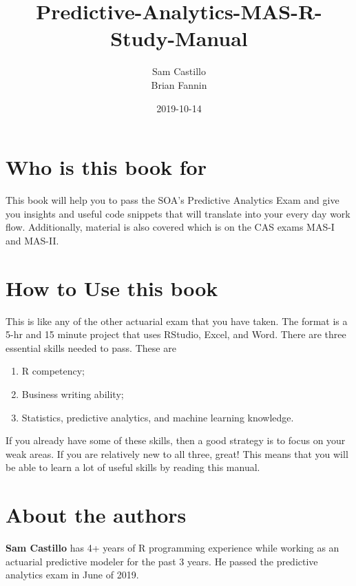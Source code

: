 \documentclass[]{book}
\title{Predictive-Analytics-MAS-R-Study-Manual}
\author{Sam Castillo \\ Brian Fannin}
\date{2019-10-14}
\providecommand{\tightlist}{%
  \setlength{\itemsep}{0pt}\setlength{\parskip}{0pt}}
\begin{document}
\maketitle

{
\setcounter{tocdepth}{1}
\tableofcontents
}
\hypertarget{who-is-this-book-for}{%
\chapter{Who is this book for}\label{who-is-this-book-for}}

This book will help you to pass the SOA's Predictive Analytics Exam and give you insights and useful code snippets that will translate into your every day work flow. Additionally, material is also covered which is on the CAS exams MAS-I and MAS-II.

\hypertarget{how-to-use-this-book}{%
\chapter{How to Use this book}\label{how-to-use-this-book}}

This is like any of the other actuarial exam that you have taken. The format is a 5-hr and 15 minute project that uses RStudio, Excel, and Word. There are three essential skills needed to pass. These are

\begin{enumerate}
\def\labelenumi{\arabic{enumi}.}
\tightlist
\item
  R competency;
\item
  Business writing ability;
\item
  Statistics, predictive analytics, and machine learning knowledge.
\end{enumerate}

If you already have some of these skills, then a good strategy is to focus on your weak areas. If you are relatively new to all three, great! This means that you will be able to learn a lot of useful skills by reading this manual.

\hypertarget{about-the-authors}{%
\chapter{About the authors}\label{about-the-authors}}

\textbf{Sam Castillo} has 4+ years of R programming experience while working as an actuarial predictive modeler for the past 3 years. He passed the predictive analytics exam in June of 2019.
\end{document}
